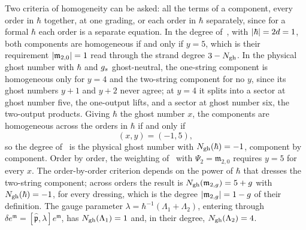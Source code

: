 Two criteria of homogeneity can be asked: all the terms of a component, every order in $\hbar$ together, at one grading, or each order in $\hbar$ separately, since for a formal $\hbar$ each order is a separate equation.
In the degree of~\cite{Cieliebak:2015:HomologicalAlgebraRelated}, with ${|\hbar|} = 2 d = 1$, both components are homogeneous if and only if $y = 5$, which is their requirement ${|\mathfrak{m}_{2, 0}|} = 1$ read through the strand degree $3 - N_{\text{gh}}$.
In the physical ghost number with $\hbar$ and $g_s$ ghost-neutral, the one-string component is homogeneous only for $y = 4$ and the two-string component for no $y$, since its ghost numbers $y + 1$ and $y + 2$ never agree; at $y = 4$ it splits into a sector at ghost number five, the one-output lifts, and a sector at ghost number six, the two-output products.
Giving $\hbar$ the ghost number $x$, the components are homogeneous across the orders in $\hbar$ if and only if
\begin{equation}
  (x, y)
    = (-1, 5),
\end{equation}
so the degree of~\cite{Cieliebak:2015:HomologicalAlgebraRelated} is the physical ghost number with $N_{\text{gh}}(\hbar) = -1$, component by component.
Order by order, the weighting of~\cite{Cieliebak:2015:HomologicalAlgebraRelated} with $\Psi_2 = \mathfrak{m}_{2, 0}$ requires $y = 5$ for every $x$.
The order-by-order criterion depends on the power of $\hbar$ that dresses the two-string component; across orders the result is $N_{\text{gh}}(\mathfrak{m}_{2, g}) = 5 + g$ with $N_{\text{gh}}(\hbar) = -1$, for every dressing, which is the degree ${|\mathfrak{m}_{2, g}|} = 1 - g$ of their definition.
The gauge parameter $\lambda = \hbar^{-1} (\Lambda_1 + \Lambda_2)$, entering through $\delta e^{\mathfrak{m}} = [\hat{\mathfrak{p}}, \lambda] e^{\mathfrak{m}}$, has $N_{\text{gh}}(\Lambda_1) = 1$ and, in their degree, $N_{\text{gh}}(\Lambda_2) = 4$.

